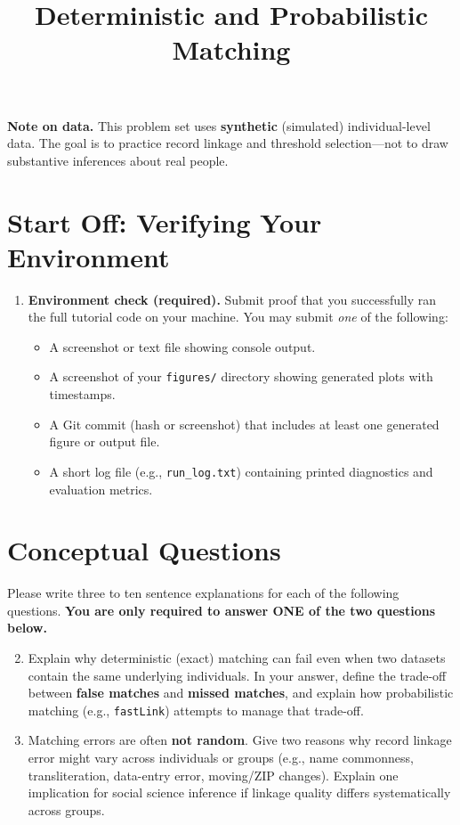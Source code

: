 \documentclass[11pt]{article}
\title{ Deterministic and Probabilistic Matching}
\author{ }
\date{ }
\begin{document}
\maketitle

\noindent \textbf{Note on data.} This problem set uses \textbf{synthetic} (simulated) individual-level data. The goal is to practice record linkage and threshold selection---not to draw substantive inferences about real people.

\section*{Start Off: Verifying Your Environment}

\begin{enumerate}
\item \textbf{Environment check (required).}  
Submit proof that you successfully ran the full tutorial code on your machine. You may submit \emph{one} of the following:
\begin{itemize}
  \item A screenshot or text file showing console output.
  \item A screenshot of your \texttt{figures/} directory showing generated plots with timestamps.
  \item A Git commit (hash or screenshot) that includes at least one generated figure or output file.
  \item A short log file (e.g., \texttt{run\_log.txt}) containing printed diagnostics and evaluation metrics.
\end{itemize}
\end{enumerate}

\section*{Conceptual Questions}
Please write three to ten sentence explanations for each of the following questions. \textbf{You are only required to answer ONE of the two questions below.} \bigskip
 
\begin{enumerate}
\setcounter{enumi}{1}

\item Explain why deterministic (exact) matching can fail even when two datasets contain the same underlying individuals. In your answer, define the trade-off between \textbf{false matches} and \textbf{missed matches}, and explain how probabilistic matching (e.g., \texttt{fastLink}) attempts to manage that trade-off.

\item Matching errors are often \textbf{not random}. Give two reasons why record linkage error might vary across individuals or groups (e.g., name commonness, transliteration, data-entry error, moving/ZIP changes). Explain one implication for social science inference if linkage quality differs systematically across groups.

  \end{enumerate}
\end{document}
